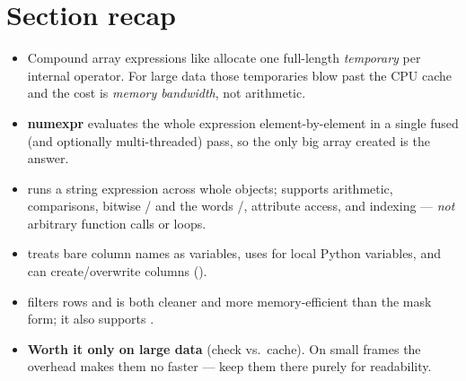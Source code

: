 \documentclass[11pt]{article}
\begin{document}
\section*{Section recap}
\begin{itemize}
  \item Compound array expressions like  allocate one full-length \emph{temporary} per internal operator. For large data those temporaries blow past the CPU cache and the cost is \emph{memory bandwidth}, not arithmetic.
  \item \textbf{numexpr} evaluates the whole expression element-by-element in a single fused (and optionally multi-threaded) pass, so the only big array created is the answer.
  \item {} runs a string expression across whole objects; supports arithmetic, comparisons, bitwise \code{&}/\code{|} and the words /, attribute access, and indexing --- \emph{not} arbitrary function calls or loops.
  \item {} treats bare column names as variables, uses  for local Python variables, and can create/overwrite columns ().
  \item {} filters rows and is both cleaner and more memory-efficient than the  mask form; it also supports .
  \item \textbf{Worth it only on large data} (check  vs.\ cache). On small frames the overhead makes them no faster --- keep them there purely for readability.
\end{itemize}
\end{document}
